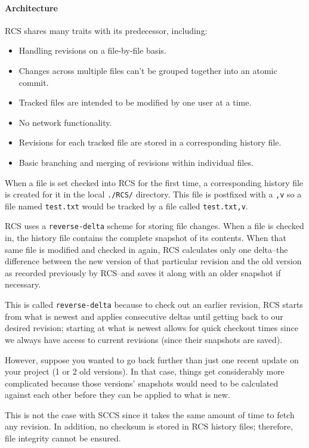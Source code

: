 \paragraph{Architecture}
RCS shares many traits with its predecessor, including:
\begin{itemize}
    \item Handling revisions on a file-by-file basis.
    \item Changes across multiple files can't be grouped together into an atomic commit.
    \item Tracked files are intended to be modified by one user at a time.
    \item No network functionality.
    \item Revisions for each tracked file are stored in a corresponding history file.
    \item Basic branching and merging of revisions within individual files.
\end{itemize}
When a file is set checked into RCS for the first time, a corresponding history file is created for it in the local \lstinline{./RCS/} directory. This file is postfixed with a \lstinline{,v} so a file named \lstinline{test.txt} would be tracked by a file called \lstinline{test.txt,v}.

RCS uses a \lstinline{reverse-delta} scheme for storing file changes. When a file is checked in, the history file contains the complete snapshot of its contents. When that same file is modified and checked in again, RCS calculates only one delta--the difference between the new version of that particular revision and the old version as recorded previously by RCS--and saves it along with an older snapshot if necessary.

This is called \lstinline{reverse-delta} because to check out an earlier revision, RCS starts from what is newest and applies consecutive deltas until getting back to our desired revision; starting at what is newest allows for quick checkout times since we always have access to current revisions (since their snapshots are saved).

However, suppose you wanted to go back further than just one recent update on your project (1 or 2 old versions). In that case, things get considerably more complicated because those versions' snapshots would need to be calculated against each other before they can be applied to what is new.

This is not the case with SCCS since it takes the same amount of time to fetch any revision. In addition, no checksum is stored in RCS history files; therefore, file integrity cannot be ensured.

